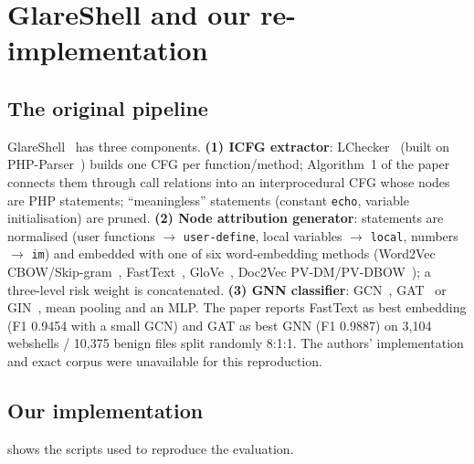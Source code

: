 \section{GlareShell and our re-implementation}\label{sec:method}

\subsection{The original pipeline}
GlareShell~\paperref{} has three components.
\textbf{(1) ICFG extractor}: LChecker~\cite{li2021lchecker} (built on PHP-Parser~\cite{phpparser}) builds one CFG per
function/method; Algorithm~1 of the paper connects them through call relations into an interprocedural CFG
whose nodes are PHP statements; ``meaningless'' statements (constant \texttt{echo}, variable initialisation)
are pruned.
\textbf{(2) Node attribution generator}: statements are normalised (user functions $\to$ \texttt{user-define},
local variables $\to$ \texttt{local}, numbers $\to$ \texttt{im}) and embedded with one of six word-embedding
methods (Word2Vec CBOW/Skip-gram~\cite{mikolov2013word2vec}, FastText~\cite{bojanowski2017fasttext},
GloVe~\cite{pennington2014glove}, Doc2Vec PV-DM/PV-DBOW~\cite{le2014doc2vec}); a three-level risk weight is
concatenated.
\textbf{(3) GNN classifier}: GCN~\cite{kipf2017gcn}, GAT~\cite{velickovic2018gat} or GIN~\cite{xu2019gin},
mean pooling and an MLP. The paper reports FastText as best embedding (F1 0.9454 with a small GCN) and GAT as
best GNN (F1 0.9887) on 3,104 webshells / 10,375 benign files split randomly 8:1:1.
The authors' implementation and exact corpus were unavailable for this reproduction.

\subsection{Our implementation}
 shows the scripts used to reproduce the evaluation.

